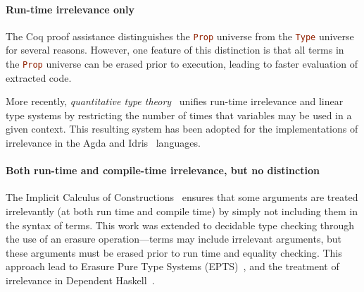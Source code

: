 \documentclass{article}
\newcommand\cd[1]{\lstinline[language=Haskell]{#1}}
\theoremstyle{definition}
\begin{document}
\paragraph{Run-time irrelevance only}

The Coq proof assistance distinguishes the \cd{Prop} universe from the
\cd{Type} universe for several reasons. However, one feature of this
distinction is that all terms in the \cd{Prop} universe can be erased prior to
execution, leading to faster evaluation of extracted code.

More recently, \emph{quantitative type theory}~\cite{atkey} unifies run-time
irrelevance and linear type systems by restricting the number of times that
variables may be used in a given context. This resulting system has been
adopted for the implementations of irrelevance in the Agda and
Idris~\cite{idris2} languages.

\paragraph{Both run-time and compile-time irrelevance, but no distinction}

The Implicit Calculus of Constructions~\cite{miquel} ensures that some
arguments are treated irrelevantly (at both run time and compile time) by simply
not including them in the syntax of terms. This work was extended to decidable
type checking through the use of an erasure operation---terms may include
irrelevant arguments, but these arguments must be erased prior to run time and
equality checking\cite{icc-star}. This approach lead to Erasure Pure Type
Systems (EPTS)~\cite{mishra-linger:epts}, and the treatment of irrelevance in
Dependent Haskell~\cite{weirich:systemd}.

{}





\end{document}
